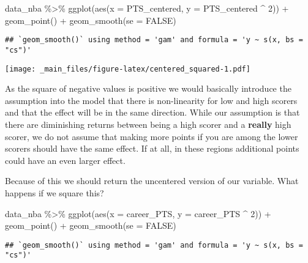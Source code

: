 \documentclass[
]{book}
\newenvironment{Shaded}{\begin{snugshade}}{\end{snugshade}}
\newcommand{\AttributeTok}[1]{\textcolor[rgb]{0.77,0.63,0.00}{#1}}
\newcommand{\ConstantTok}[1]{\textcolor[rgb]{0.00,0.00,0.00}{#1}}
\newcommand{\DecValTok}[1]{\textcolor[rgb]{0.00,0.00,0.81}{#1}}
\newcommand{\FunctionTok}[1]{\textcolor[rgb]{0.00,0.00,0.00}{#1}}
\newcommand{\NormalTok}[1]{#1}
\newcommand{\SpecialCharTok}[1]{\textcolor[rgb]{0.00,0.00,0.00}{#1}}
\begin{document}
\begin{Shaded}
\begin{Highlighting}[]
\NormalTok{data\_nba }\SpecialCharTok{\%\textgreater{}\%} 
  \FunctionTok{ggplot}\NormalTok{(}\FunctionTok{aes}\NormalTok{(}\AttributeTok{x =}\NormalTok{ PTS\_centered, }\AttributeTok{y =}\NormalTok{ PTS\_centered }\SpecialCharTok{\^{}} \DecValTok{2}\NormalTok{)) }\SpecialCharTok{+}
  \FunctionTok{geom\_point}\NormalTok{() }\SpecialCharTok{+}
  \FunctionTok{geom\_smooth}\NormalTok{(}\AttributeTok{se =} \ConstantTok{FALSE}\NormalTok{)}
\end{Highlighting}
\end{Shaded}

\begin{verbatim}
## `geom_smooth()` using method = 'gam' and formula = 'y ~ s(x, bs = "cs")'
\end{verbatim}

\texttt{[image: \_main\_files/figure-latex/centered\_squared-1.pdf]}

As the square of negative values is positive we would basically introduce the
assumption into the model that there is non-linearity for low and high scorers
and that the effect will be in the same direction. While our assumption is that
there are diminishing returns between being a high scorer and a \textbf{really} high
scorer, we do not assume that making more points if you are among the lower
scorers should have the same effect. If at all, in these regions additional
points could have an even larger effect.

Because of this we should return the uncentered version of our variable. What
happens if we square this?

\begin{Shaded}
\begin{Highlighting}[]
\NormalTok{data\_nba }\SpecialCharTok{\%\textgreater{}\%} 
  \FunctionTok{ggplot}\NormalTok{(}\FunctionTok{aes}\NormalTok{(}\AttributeTok{x =}\NormalTok{ career\_PTS, }\AttributeTok{y =}\NormalTok{ career\_PTS }\SpecialCharTok{\^{}} \DecValTok{2}\NormalTok{)) }\SpecialCharTok{+}
  \FunctionTok{geom\_point}\NormalTok{() }\SpecialCharTok{+}
  \FunctionTok{geom\_smooth}\NormalTok{(}\AttributeTok{se =} \ConstantTok{FALSE}\NormalTok{)}
\end{Highlighting}
\end{Shaded}

\begin{verbatim}
## `geom_smooth()` using method = 'gam' and formula = 'y ~ s(x, bs = "cs")'
\end{verbatim}
\end{document}
